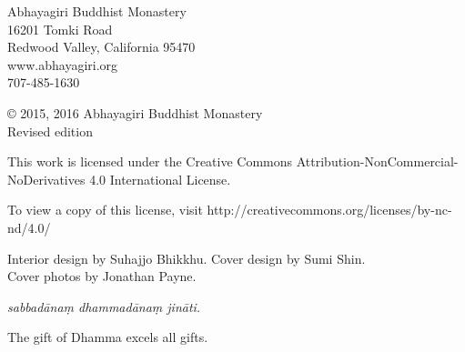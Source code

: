 \thispagestyle{empty}
{\footnotesize\raggedright
{}

\vspace{1em}
Abhayagiri Buddhist Monastery\\
16201 Tomki Road\\
Redwood Valley, California 95470\\
www.abhayagiri.org\\
707-485-1630

\vspace{1em}
\copyright{} 2015, 2016 Abhayagiri Buddhist Monastery\\
Revised edition

\vspace{1em}
This work is licensed under the Creative Commons
Attribution-NonCommercial-NoDerivatives 4.0 International License.

To view a copy of this license, visit
http://creativecommons.org/licenses/by-nc-nd/4.0/

\vspace{1em}

Interior design by Suhajjo Bhikkhu. Cover design by Sumi Shin.\\
Cover photos by Jonathan Payne. 

\vspace{1em}

\textit{sabbadānaṃ dhammadānaṃ jināti.}

The gift of Dhamma excels all gifts.
}

\clearpage
